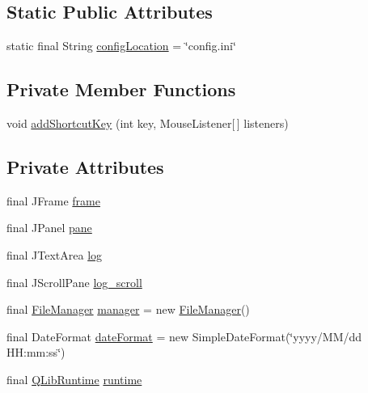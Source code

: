 \subsection*{Static Public Attributes}
\begin{DoxyCompactItemize}
\item 
static final String \hyperlink{classqlib_1_1ide_1_1QLibIDE_ae54da93b399d4d027f33c04ba7e392fd}{config\+Location} = \char`\"{}config.\+ini\char`\"{}
\end{DoxyCompactItemize}
\subsection*{Private Member Functions}
\begin{DoxyCompactItemize}
\item 
void \hyperlink{classqlib_1_1ide_1_1QLibIDE_a6f9aa8bdf86b91b456239c96202d2e3f}{add\+Shortcut\+Key} (int key, Mouse\+Listener\mbox{[}$\,$\mbox{]} listeners)
\end{DoxyCompactItemize}
\subsection*{Private Attributes}
\begin{DoxyCompactItemize}
\item 
final J\+Frame \hyperlink{classqlib_1_1ide_1_1QLibIDE_a13a62cb428150031089c3824f16d6bef}{frame}
\item 
final J\+Panel \hyperlink{classqlib_1_1ide_1_1QLibIDE_a599d44725656f74ca6d6fc028b8973a8}{pane}
\item 
final J\+Text\+Area \hyperlink{classqlib_1_1ide_1_1QLibIDE_aa92d671c5f0158e59c86767109afc92c}{log}
\item 
final J\+Scroll\+Pane \hyperlink{classqlib_1_1ide_1_1QLibIDE_a74ee30733f7d424f2e518f1171d70917}{log\+\_\+scroll}
\item 
final \hyperlink{classqlib_1_1ide_1_1FileManager}{File\+Manager} \hyperlink{classqlib_1_1ide_1_1QLibIDE_a5af68fc042aeee1b69f27f3e1e67610b}{manager} = new \hyperlink{classqlib_1_1ide_1_1FileManager}{File\+Manager}()
\item 
final Date\+Format \hyperlink{classqlib_1_1ide_1_1QLibIDE_ac1128e9b1f1d79af9c480383ab6a16ac}{date\+Format} = new Simple\+Date\+Format(\char`\"{}yyyy/MM/dd H\+H\+:mm\+:ss\char`\"{})
\item 
final \hyperlink{classqlib_1_1ide_1_1QLibRuntime}{Q\+Lib\+Runtime} \hyperlink{classqlib_1_1ide_1_1QLibIDE_a07b6d9558a76bd5d818a98debdb93d5f}{runtime}
\end{DoxyCompactItemize}


